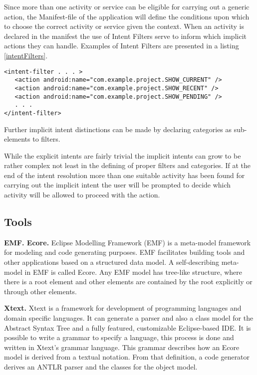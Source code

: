 Since more than one activity or service can be eligible for carrying out a generic action, the Manifest-file of the application will define the conditions upon which to choose the correct activity or service given the context. When an activity is declared in the manifest the use of Intent Filters serve to inform which implicit actions they can handle. Examples of Intent Filters are presented in a listing \ref{intentFilters}.

{\footnotesize\begin{lstlisting}[label=intentFilters,caption=Intent Filters]
<intent-filter . . . >
   <action android:name="com.example.project.SHOW_CURRENT" />
   <action android:name="com.example.project.SHOW_RECENT" />
   <action android:name="com.example.project.SHOW_PENDING" />
   . . .
</intent-filter>
\end{lstlisting}}

Further implicit intent distinctions can be made by declaring categories as sub-elements to filters.

While the explicit intents are fairly trivial the implicit intents can grow to be rather complex not least in the defining of proper filters and categories. If at the end of the intent resolution more than one suitable activity has been found for carrying out the implicit intent the user will be prompted to decide which activity will be allowed to proceed with the action. 


\subsection{Tools}
\label{tools}
\textbf{EMF. Ecore.} Eclipse Modelling Framework (EMF) \cite{emf} is a meta-model framework for modeling and code generating purposes. EMF facilitates building tools and other applications based on a structured data model. A self-describing meta-model in EMF is called Ecore. Any EMF model has tree-like structure, where there is a root element and other elements are contained by the root explicitly or through other elements. 

\textbf{Xtext.} Xtext \cite{xtext} is a framework for development of programming languages and domain specific languages. It can generate a parser and also a class model for the Abstract Syntax Tree and a fully featured, customizable Eclipse-based IDE. It is possible to write a grammar to specify a language, this process is done and written in Xtext's grammar language. This grammar describes how an Ecore model is derived from a textual notation. From that definition, a code generator derives an ANTLR parser and the classes for the object model.


